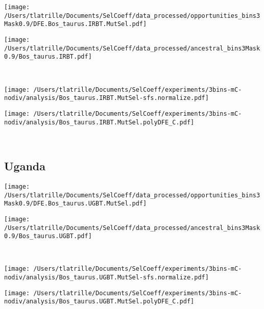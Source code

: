 \documentclass{article}
\begin{document}
    \begin{minipage}{0.49\linewidth}
        \texttt{[image: /Users/tlatrille/Documents/SelCoeff/data\_processed/opportunities\_bins3Mask0.9/DFE.Bos\_taurus.IRBT.MutSel.pdf]}
    \end{minipage}
    \begin{minipage}{0.49\linewidth}
        \texttt{[image: /Users/tlatrille/Documents/SelCoeff/data\_processed/ancestral\_bins3Mask0.9/Bos\_taurus.IRBT.pdf]}
    \end{minipage}
    \\
    \begin{minipage}{0.49\linewidth}
        \texttt{[image: /Users/tlatrille/Documents/SelCoeff/experiments/3bins-mC-nodiv/analysis/Bos\_taurus.IRBT.MutSel-sfs.normalize.pdf]}
    \end{minipage}
    \begin{minipage}{0.49\linewidth}
        \texttt{[image: /Users/tlatrille/Documents/SelCoeff/experiments/3bins-mC-nodiv/analysis/Bos\_taurus.IRBT.MutSel.polyDFE\_C.pdf]}
    \end{minipage}
    \\
    \subsection{Uganda}

    \begin{minipage}{0.49\linewidth}
        \texttt{[image: /Users/tlatrille/Documents/SelCoeff/data\_processed/opportunities\_bins3Mask0.9/DFE.Bos\_taurus.UGBT.MutSel.pdf]}
    \end{minipage}
    \begin{minipage}{0.49\linewidth}
        \texttt{[image: /Users/tlatrille/Documents/SelCoeff/data\_processed/ancestral\_bins3Mask0.9/Bos\_taurus.UGBT.pdf]}
    \end{minipage}
    \\
    \begin{minipage}{0.49\linewidth}
        \texttt{[image: /Users/tlatrille/Documents/SelCoeff/experiments/3bins-mC-nodiv/analysis/Bos\_taurus.UGBT.MutSel-sfs.normalize.pdf]}
    \end{minipage}
    \begin{minipage}{0.49\linewidth}
        \texttt{[image: /Users/tlatrille/Documents/SelCoeff/experiments/3bins-mC-nodiv/analysis/Bos\_taurus.UGBT.MutSel.polyDFE\_C.pdf]}
    \end{minipage}
    \\
\end{document}
